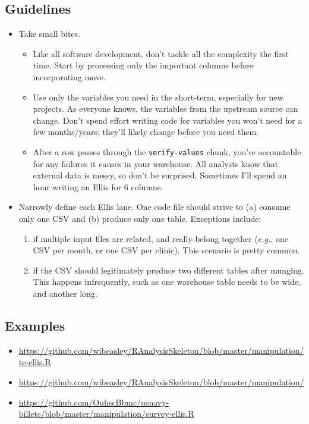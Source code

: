 \documentclass[
]{book}
\providecommand{\tightlist}{%
  \setlength{\itemsep}{0pt}\setlength{\parskip}{0pt}}
\begin{document}
\hypertarget{guidelines}{%
\subsection{Guidelines}\label{guidelines}}

\begin{itemize}
\item
  Take small bites.

  \begin{itemize}
  \tightlist
  \item
    Like all software development, don't tackle all the complexity the first time. Start by processing only the important columns before incorporating move.
  \item
    Use only the variables you need in the short-term, especially for new projects. As everyone knows, the variables from the upstream source can change. Don't spend effort writing code for variables you won't need for a few months/years; they'll likely change before you need them.
  \item
    After a row passes through the \texttt{verify-values} chunk, you're accountable for any failures it causes in your warehouse. All analysts know that external data is messy, so don't be surprised. Sometimes I'll spend an hour writing an Ellis for 6 columns.
  \end{itemize}
\item
  Narrowly define each Ellis lane. One code file should strive to (a) consume only one CSV and (b) produce only one table. Exceptions include:

  \begin{enumerate}
  \def\labelenumi{\arabic{enumi}.}
  \tightlist
  \item
    if multiple input files are related, and really belong together (\emph{e.g.}, one CSV per month, or one CSV per clinic). This scenario is pretty common.
  \item
    if the CSV should legitimately produce two different tables after munging. This happens infrequently, such as one warehouse table needs to be wide, and another long.
  \end{enumerate}
\end{itemize}

\hypertarget{examples}{%
\subsection{Examples}\label{examples}}

\begin{itemize}
\tightlist
\item
  \url{https://github.com/wibeasley/RAnalysisSkeleton/blob/master/manipulation/te-ellis.R}
\item
  \url{https://github.com/wibeasley/RAnalysisSkeleton/blob/master/manipulation/}
\item
  \url{https://github.com/OuhscBbmc/usnavy-billets/blob/master/manipulation/survey-ellis.R}
\end{itemize}
\end{document}
